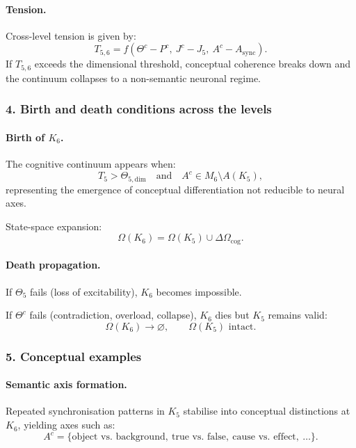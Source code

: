 \paragraph{Tension.}
Cross-level tension is given by:
\[
T_{5,6} = f(\Theta^{c} - P^{c},\ J^{c} - J_5,\ A^{c} - A_{\mathrm{sync}}).
\]
If $T_{5,6}$ exceeds the dimensional threshold, conceptual coherence
breaks down and the continuum collapses to a non-semantic neuronal regime.

\subsubsection{4. Birth and death conditions across the levels}

\paragraph{Birth of \texorpdfstring{$K_6$}{K_6}.}
The cognitive continuum appears when:
\[
T_5 > \Theta_{5,\mathrm{dim}}
\quad\text{and}\quad
A^{c} \in M_6 \setminus A(K_5),
\]
representing the emergence of conceptual differentiation not reducible to 
neural axes.

State-space expansion:
\[
\Omega(K_6) = \Omega(K_5) \cup \Delta\Omega_{\mathrm{cog}}.
\]

\paragraph{Death propagation.}
If $\Theta_5$ fails (loss of excitability), $K_6$ becomes impossible.

If $\Theta^{c}$ fails (contradiction, overload, collapse), $K_6$ dies but
$K_5$ remains valid:
\[
\Omega(K_6) \rightarrow \varnothing,
\qquad
\Omega(K_5) \text{ intact}.
\]

\subsubsection{5. Conceptual examples}

\paragraph{Semantic axis formation.}
Repeated synchronisation patterns in $K_5$ stabilise into conceptual
distinctions at $K_6$, yielding axes such as:
\[
A^{c} = \{\text{object vs. background},\ \text{true vs. false},\
         \text{cause vs. effect},\ \ldots\}.
\]

